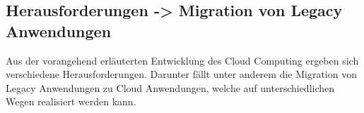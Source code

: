 \subsection{Herausforderungen -> Migration von Legacy Anwendungen}

Aus der vorangehend erläuterten Entwicklung des Cloud Computing ergeben sich verschiedene Herausforderungen.
Darunter fällt unter anderem die Migration von Legacy Anwendungen zu Cloud Anwendungen, welche auf unterschiedlichen
Wegen realisiert werden kann.